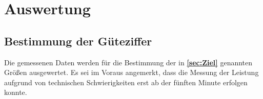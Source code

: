 \section{Auswertung}
\label{sec:Auswertung}

\subsection{Bestimmung der Güteziffer}


Die gemessenen Daten werden für die Bestimmung der in \textbf{\ref{sec:Ziel}} genannten Größen ausgewertet.
Es sei im Voraus angemerkt, dass die Messung der Leistung aufgrund von technischen Schwierigkeiten erst ab der fünften Minute erfolgen konnte. 
\\

